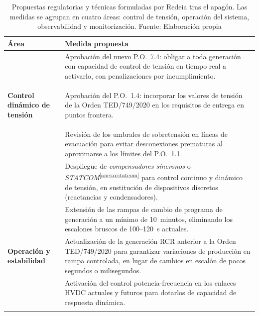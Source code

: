 \begin{table}[H]
\centering
\caption[Propuestas regulatorias y técnicas de Redeia tras el apagón del 28 de abril.]{%
Propuestas regulatorias y técnicas formuladas por Redeia tras el apagón.
Las medidas se agrupan en cuatro áreas: control de tensión, operación
del sistema, observabilidad y monitorización. Fuente: Elaboración propia}
\label{tab:propuestas_ree}
\vspace{0.3cm}
\small
\begin{tabularx}{\textwidth}{>{\centering\bfseries}p{3.2cm} >{\centering\arraybackslash}X}
\toprule
\textbf{Área} & \textbf{Medida propuesta} \\
\midrule

&
Aprobación del nuevo P.O.~7.4: obligar a toda generación con capacidad
de control de tensión en tiempo real a activarlo, con penalizaciones
por incumplimiento. \\
\addlinespace

\textbf{Control dinámico de tensión} &
Aprobación del P.O.~1.4: incorporar los valores de tensión de la Orden
TED/749/2020 en los requisitos de entrega en puntos frontera. \\
\addlinespace

&
Revisión de los umbrales de sobretensión en líneas de evacuación para
evitar desconexiones prematuras al aproximarse a los límites del
P.O.~1.1. \\
\addlinespace

&
Despliegue de \textit{compensadores síncronos} o
\textit{STATCOM}\textsuperscript{\ref{anexo:statcom}} para control
continuo y dinámico de tensión, en sustitución de dispositivos discretos
(reactancias y condensadores). \\

\midrule

&
Extensión de las rampas de cambio de programa de generación a un mínimo
de 10~minutos, eliminando los escalones bruscos de 100--120~s actuales. \\
\addlinespace

\textbf{Operación y estabilidad} &
Actualización de la generación RCR anterior a la Orden TED/749/2020 para
garantizar variaciones de producción en rampa controlada, en lugar de
cambios en escalón de pocos segundos o milisegundos. \\
\addlinespace

&
Activación del control potencia-frecuencia en los enlaces HVDC actuales
y futuros para dotarlos de capacidad de respuesta dinámica. \\
\addlinespace


\end{tabularx}
\end{table}
